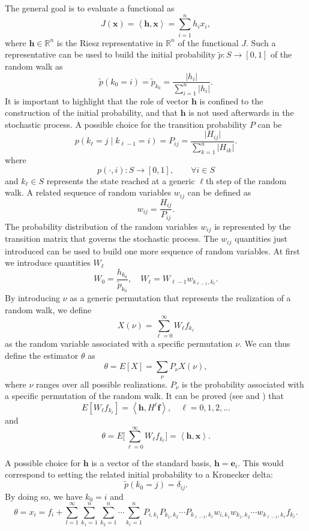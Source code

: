 \documentclass[final,leqno,onefignum,onetabnum]{siamltex1213}
\begin{document}
The general goal is to evaluate a functional as
\[
J(\mathbf{x})=\left \langle\mathbf{h},\mathbf{x}\right\rangle=\sum_{i=1}^n h_i 
x_i,
\]
where $\mathbf{h}\in \mathbb{R}^n$ is the Riesz representative in
$\mathbb{R}^n$ of the functional $J$.
Such a representative can be used to build the initial probability 
$\tilde{p}:
S\rightarrow [0,1]$ of the random walk as
\[
\tilde{p}(k_0=i)=\tilde{p}_{k_0}=\frac{\lvert h_i\rvert}{\sum_{i=1}^n 
\lvert h_i\rvert}.
\]
It is important to highlight that the role of vector $\mathbf{h}$ is
confined to the construction of the initial probability, and that $\mathbf{h}$
is not
used afterwards in the stochastic process.
A possible choice for the transition probability $P$ can be
\[
p(k_{\ell}=j \;\lvert\;k_{\ell-1}=i )=P_{ij}=\frac{\lvert 
H_{ij}\rvert}{\sum_{k=1}^n
\lvert H_{ik}\rvert}.
\]
where 
\[
p(\cdot,i):S\rightarrow [0,1], \qquad \forall i\in S
\]
and $k_{\ell}\in S$ 
represents the state reached at a generic $\ell$th step of the random walk.
A related sequence of random variables $w_{ij}$ can be defined
as
\[
w_{ij}=\frac{H_{ij}}{P_{ij}}.
\]
The probability distribution of the random variables $w_{ij}$ is represented
by the transition matrix that governs the stochastic process. The $w_{ij}$
quantities just introduced can be used to build one more sequence
of random variables.
At first we introduce quantities $W_\ell$
\[
W_{0}=\frac{h_{k_0}}{\tilde{p}_{k_0}}, \quad W_{\ell}=W_{\ell-1} 
w_{k_{\ell-1},k_{\ell}}.
\]
By introducing $\nu$ as a generic permutation that represents the realization 
of a random walk, we define
\[
X(\nu)=\sum_{\ell=0}^\infty W_{\ell} f_{k_{\ell}}
\]
as the random variable associated with a specific permutation $\nu$. 
We can thus
define the estimator $\theta$ as
\[
\theta=E[X]=\sum_{\nu}P_{\nu}X(\nu),
\]
where $\nu$ ranges over all possible realizations.
$P_{\nu}$ is the probability associated with a specific permutation of the
random walk.
It can be proved (see \cite{Hal1962} and \cite{Hal1994}) that
\[
E[W_{\ell} 
f_{k_{\ell}}]=\left\langle\mathbf{h},H^{\ell}\mathbf{f}\right\rangle, \quad 
\ell=0,1,2,\ldots
\]
and
\[
\theta=E\bigg[\sum_{\ell=0}^\infty W_{\ell} 
f_{k_{\ell}}\bigg]=\left\langle\mathbf{h},\mathbf{x}\right\rangle.
\]

A possible choice for $\mathbf{h}$ is a vector of the standard basis, 
$\mathbf{h} = \mathbf{e}_i$. This
would correspond to setting the related initial probability to a Kronecker 
delta:
\[
\tilde{p}(k_0=j)=\delta_{ij}.
\]
By doing so, we have $k_0 = i$ and 
\begin{equation}
\theta = x_i= 
f_i + \sum_{l=1}^\infty
\sum_{k_1=1}^{n}\sum_{k_2=1}^n\cdots \sum_{k_{\ell}=1}^n
P_{i,k_1}P_{k_1,k_2}\cdots P_{k_{\ell-1},
k_{\ell}}w_{i,k_1}w_{k_1,k_2}\cdots
w_{k_{\ell-1}, k_{\ell}}f_{k_{\ell}}.
\label{dir_mean}
\end{equation}
\end{document}
